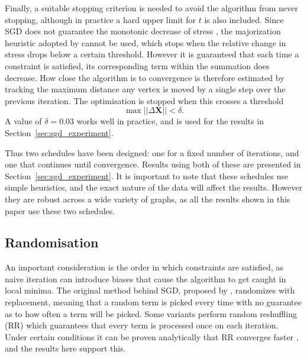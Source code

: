 Finally, a suitable stopping criterion is needed to avoid the algorithm from never stopping, although in practice a hard upper limit for $t$ is also included. Since SGD does not guarantee the monotonic decrease of stress \citep{Darken1992}, the majorization heuristic adopted by \citet{Gansner2004} cannot be used, which stops when the relative change in stress drops below a certain threshold.
However it is guaranteed that each time a constraint is satisfied, its corresponding term within the summation does decrease.
How close the algorithm is to convergence is therefore estimated by tracking the maximum distance any vertex is moved by a single step over the previous iteration. The optimisation is stopped when this crosses a threshold
\begin{equation}
  \max||\Delta\mathbf{X}|| < \delta.
\end{equation}
A value of $\delta=0.03$ works well in practice, and is used for the results in Section~\ref{sec:sgd_experiment}.

Thus two schedules have been designed: one for a fixed number of iterations, and one that continues until convergence.
Results using both of these are presented in Section~\ref{sec:sgd_experiment}.
It is important to note that these schedules use simple heuristics, and the exact nature of the data will affect the results.
However they are robust across a wide variety of graphs, as all the results shown in this paper use these two schedules.

\subsection{Randomisation}
\label{sec:randomisation}
An important consideration is the order in which constraints are satisfied, as naive iteration can introduce biases that cause the algorithm to get caught in local minima.
The original method behind SGD, proposed by \citet{Robbins1951}, randomizes with replacement, meaning that a random term is picked every time with no guarantee as to how often a term will be picked. Some variants perform random reshuffling (RR) which guarantees that every term is processed once on each iteration. Under certain conditions it can be proven analytically that RR converges faster \citep{Gurbuzbalaban2019}, and the results here support this.

